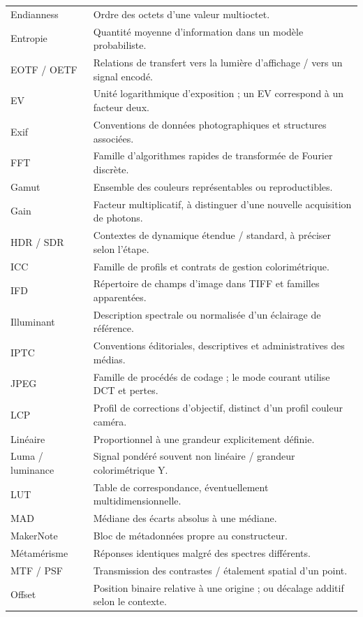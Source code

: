 \begin{longtable}{p{3.4cm}p{11.2cm}}
Endianness & Ordre des octets d'une valeur multioctet. \\
Entropie & Quantité moyenne d'information dans un modèle probabiliste. \\
EOTF / OETF & Relations de transfert vers la lumière d'affichage / vers un signal encodé. \\
EV & Unité logarithmique d'exposition ; un EV correspond à un facteur deux. \\
Exif & Conventions de données photographiques et structures associées. \\
FFT & Famille d'algorithmes rapides de transformée de Fourier discrète. \\
Gamut & Ensemble des couleurs représentables ou reproductibles. \\
Gain & Facteur multiplicatif, à distinguer d'une nouvelle acquisition de photons. \\
HDR / SDR & Contextes de dynamique étendue / standard, à préciser selon l'étape. \\
ICC & Famille de profils et contrats de gestion colorimétrique. \\
IFD & Répertoire de champs d'image dans TIFF et familles apparentées. \\
Illuminant & Description spectrale ou normalisée d'un éclairage de référence. \\
IPTC & Conventions éditoriales, descriptives et administratives des médias. \\
JPEG & Famille de procédés de codage ; le mode courant utilise DCT et pertes. \\
LCP & Profil de corrections d'objectif, distinct d'un profil couleur caméra. \\
Linéaire & Proportionnel à une grandeur explicitement définie. \\
Luma / luminance & Signal pondéré souvent non linéaire / grandeur colorimétrique Y. \\
LUT & Table de correspondance, éventuellement multidimensionnelle. \\
MAD & Médiane des écarts absolus à une médiane. \\
MakerNote & Bloc de métadonnées propre au constructeur. \\
Métamérisme & Réponses identiques malgré des spectres différents. \\
MTF / PSF & Transmission des contrastes / étalement spatial d'un point. \\
Offset & Position binaire relative à une origine ; ou décalage additif selon le contexte. \\

\end{longtable}
